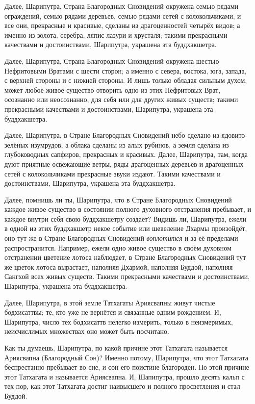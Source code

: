\documentclass[openany, oneside]{book}
\begin{document}
Далее, Шарипутра, Страна Благородных Сновидений окружена семью рядами ограждений, семью рядами деревьев, семью рядами сетей с колокольчиками, и все они, прекрасные и красивые, сделаны из драгоценностей четырёх видов; а именно из золота, серебра, ляпис-лазури и хрусталя; такими прекрасными качествами и достоинствами, Шарипутра, украшена эта буддхакшетра.

Далее, Шарипутра, Страна Благородных Сновидений окружена шестью Нефритовыми Вратами с шести сторон; а именно с севера, востока, юга, запада, с верхней стороны и с нижней стороны. И лишь только обладая сильным духом, может любое живое существо отворить одно из этих Нефритовых Врат, осознанно или неосознанно, для себя или для других живых существ; такими прекрасными качествами и достоинствами, Шарипутра, украшена эта буддхакшетра.

Далее, Шарипутра, в Стране Благородных Сновидений небо сделано из ядовито-зелёных изумрудов, а облака сделаны из алых рубинов, а земля сделана из глубоководных сапфиров, прекрасных и красивых. Далее, Шарипутра, там, когда дуют приятные освежающие ветры, ряды драгоценных деревьев и драгоценных сетей с колокольчиками прекрасные звуки издают. Такими качествами и достоинствами, Шарипутра, украшена эта буддхакшетра.

Далее, помнишь ли ты, Шарипутра, что в Стране Благородных Сновидений каждое живое существо в состоянии полного духовного отстранения пребывает, и каждое внутри себя свою буддхакшетру создаёт? Видишь ли, Шарипутра, ежели в одной из этих буддхакшетр некое событие или шевеление Дхармы произойдёт, оно тут же в Стране Благородных Сновидений \textit{воплотится} и за её пределами распространится. Например, ежели одно живое существо в своём духовном отстранении цветение лотоса наблюдает, в Стране Благородных Сновидений тут же цветок лотоса вырастает, наполняя Дхармой, наполняя Буддой, наполняя Сангхой всех живых существ. Такими прекрасными качествами и достоинствами, Шарипутра, украшена эта буддхакшетра.

Далее, Шарипутра, в этой земле Татхагаты Ариясвапны живут чистые бодхисаттвы; те, кто уже не вернётся и связанные одним рождением. И, Шарипутра, число тех бодхисаттв нелегко измерить, только в неизмеримых, неисчислимых множествах оно может быть посчитано.

Как ты думаешь, Шарипутра, по какой причине этот Татхагата называется Ариясвапна (Благородный Сон)? Именно потому, Шарипутра, что этот Татхагата беспрестанно пребывает во сне, и сон его поистине благороден. По этой причине этот Татхагата и называется Ариясвапна. И, Шапипутра, прошло десять кальп с тех пор, как этот Татхагата достиг наивысшего и полного просветления и стал Буддой.
\end{document}
